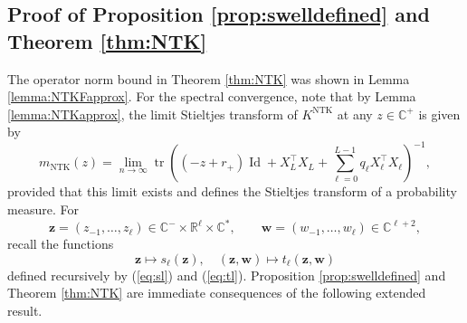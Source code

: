 \documentclass{article}
\theoremstyle{definition}
\newcommand{\R}{\mathbb{R}}
\newcommand{\C}{\mathbb{C}}
\newcommand{\Id}{\operatorname{Id}}
\newcommand{\NTK}{\text{NTK}}
\newcommand{\tr}{\operatorname{tr}}
\newcommand{\z}{\mathbf{z}}
\newcommand{\w}{\mathbf{w}}
\newcommand{\1}{\mathbf{1}}
\begin{document}
\subsection{Proof of Proposition \ref{prop:swelldefined} and
Theorem \ref{thm:NTK}}

The operator norm bound in Theorem \ref{thm:NTK} was shown in Lemma
\ref{lemma:NTKFapprox}. For the spectral convergence,
note that by Lemma \ref{lemma:NTKapprox}, the limit Stieltjes transform of
$K^\NTK$ at any $z \in \C^+$ is given by
\[m_\NTK(z)=\lim_{n \to \infty} \tr \left((-z+r_+)\Id+X_L^\top X_L
+\sum_{\ell=0}^{L-1} q_\ell X_\ell^\top X_\ell\right)^{-1},\]
provided that this limit exists and defines the Stieltjes transform of a
probability measure. For
\[\z=(z_{-1},\ldots,z_\ell) \in \C^- \times \R^\ell \times \C^*,
\qquad \w=(w_{-1},\ldots,w_\ell) \in \C^{\ell+2},\]
recall the functions
\[\z \mapsto s_\ell(\z), \quad (\z,\w) \mapsto t_\ell(\z,\w)\]
defined recursively by (\ref{eq:sl}) and (\ref{eq:tl}). Proposition \ref{prop:swelldefined} and Theorem \ref{thm:NTK} are immediate
consequences of the following extended result.
\end{document}
